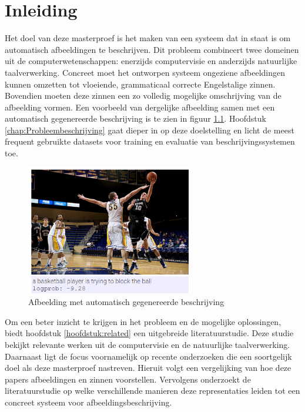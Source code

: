\chapter{Inleiding}
\label{inleiding}
Het doel van deze masterproef is het maken van een systeem dat in staat is om automatisch afbeeldingen te beschrijven. Dit probleem combineert twee domeinen uit de computerwetenschappen: enerzijds computervisie en anderzijds natuurlijke taalverwerking. Concreet moet het ontworpen systeem ongeziene afbeeldingen kunnen omzetten tot vloeiende, grammaticaal correcte Engelstalige zinnen. Bovendien moeten deze zinnen een zo volledig mogelijke omschrijving van de afbeelding vormen. Een voorbeeld van dergelijke afbeelding samen met een automatisch gegenereerde beschrijving is te zien in figuur \ref{fig:example_img}. Hoofdstuk \ref{chap:Probleembeschrijving} gaat dieper in op deze doelstelling en licht de meest frequent gebruikte datasets voor training en evaluatie van beschrijvingssystemen toe.

\begin{figure}[tb]
    \centering
    \includegraphics[width=0.65\textwidth]{Images/Results/Perfect/blocking_the_ball}
    \caption{Afbeelding met automatisch gegenereerde beschrijving}
    \label{fig:example_img}
\end{figure}

Om een beter inzicht te krijgen in het probleem en de mogelijke oplossingen, biedt hoofdstuk \ref{hoofdstuk:related} een uitgebreide literatuurstudie. Deze studie bekijkt relevante werken uit de computervisie en de natuurlijke taalverwerking. Daarnaast ligt de focus voornamelijk op recente onderzoeken die een soortgelijk doel als deze masterproef nastreven. Hieruit volgt een vergelijking van hoe deze papers afbeeldingen en zinnen voorstellen. Vervolgens onderzoekt de literatuurstudie op welke verschillende manieren deze representaties leiden tot een concreet systeem voor afbeeldingsbeschrijving.

